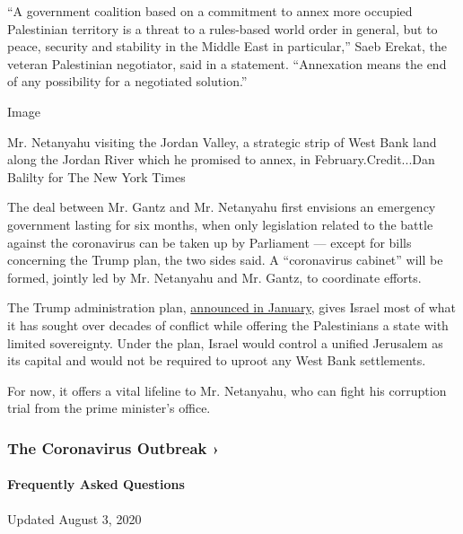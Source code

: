 ``A government coalition based on a commitment to annex more occupied
Palestinian territory is a threat to a rules-based world order in
general, but to peace, security and stability in the Middle East in
particular,'' Saeb Erekat, the veteran Palestinian negotiator, said in a
statement. ``Annexation means the end of any possibility for a
negotiated solution.''

Image

Mr. Netanyahu visiting the Jordan Valley, a strategic strip of West Bank
land along the Jordan River which he promised to annex, in
February.Credit...Dan Balilty for The New York Times

The deal between Mr. Gantz and Mr. Netanyahu first envisions an
emergency government lasting for six months, when only legislation
related to the battle against the coronavirus can be taken up by
Parliament --- except for bills concerning the Trump plan, the two sides
said. A ``coronavirus cabinet'' will be formed, jointly led by Mr.
Netanyahu and Mr. Gantz, to coordinate efforts.

The Trump administration plan,
\href{https://www.nytimes3xbfgragh.onion/2020/01/28/world/middleeast/peace-plan.html}{announced
in January}, gives Israel most of what it has sought over decades of
conflict while offering the Palestinians a state with limited
sovereignty. Under the plan, Israel would control a unified Jerusalem as
its capital and would not be required to uproot any West Bank
settlements.

For now, it offers a vital lifeline to Mr. Netanyahu, who can fight his
corruption trial from the prime minister's office.

\href{https://www.nytimes3xbfgragh.onion/news-event/coronavirus?action=click\&pgtype=Article\&state=default\&region=MAIN_CONTENT_3\&context=storylines_faq}{}

\hypertarget{the-coronavirus-outbreak-}{%
\subsubsection{The Coronavirus Outbreak
›}\label{the-coronavirus-outbreak-}}

\hypertarget{frequently-asked-questions}{%
\paragraph{Frequently Asked
Questions}\label{frequently-asked-questions}}

Updated August 3, 2020

